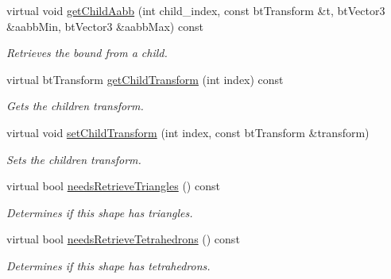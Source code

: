 \begin{DoxyCompactItemize}
\mbox{\label{classbtGImpactCompoundShape_ad5aab7d8e9258c3d0df2b6b5d7313b0f}} 
virtual void \hyperlink{classbtGImpactCompoundShape_ad5aab7d8e9258c3d0df2b6b5d7313b0f}{get\+Child\+Aabb} (int child\+\_\+index, const bt\+Transform \&t, bt\+Vector3 \&aabb\+Min, bt\+Vector3 \&aabb\+Max) const
\begin{DoxyCompactList}\small\item\em Retrieves the bound from a child. \end{DoxyCompactList}\item 
\mbox{\label{classbtGImpactCompoundShape_ac322cfe8338bb24d56f6690fb488789f}} 
virtual bt\+Transform \hyperlink{classbtGImpactCompoundShape_ac322cfe8338bb24d56f6690fb488789f}{get\+Child\+Transform} (int index) const
\begin{DoxyCompactList}\small\item\em Gets the children transform. \end{DoxyCompactList}\item 
virtual void \hyperlink{classbtGImpactCompoundShape_a560410e20842ad73227d7712a574385c}{set\+Child\+Transform} (int index, const bt\+Transform \&transform)
\begin{DoxyCompactList}\small\item\em Sets the children transform. \end{DoxyCompactList}\item 
\mbox{\label{classbtGImpactCompoundShape_ab3d78754ea1181c99ba0e982e863cca9}} 
virtual bool \hyperlink{classbtGImpactCompoundShape_ab3d78754ea1181c99ba0e982e863cca9}{needs\+Retrieve\+Triangles} () const
\begin{DoxyCompactList}\small\item\em Determines if this shape has triangles. \end{DoxyCompactList}\item 
\mbox{\label{classbtGImpactCompoundShape_abb543dfb4b62ec2de171c7cabdf66e37}} 
virtual bool \hyperlink{classbtGImpactCompoundShape_abb543dfb4b62ec2de171c7cabdf66e37}{needs\+Retrieve\+Tetrahedrons} () const
\begin{DoxyCompactList}\small\item\em Determines if this shape has tetrahedrons. \end{DoxyCompactList}\item 

\end{DoxyCompactItemize}
